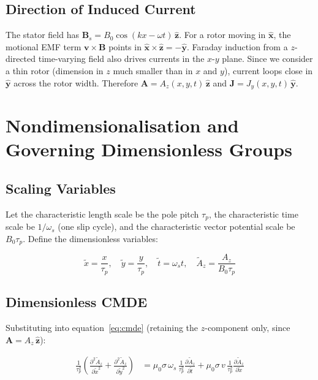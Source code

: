 \documentclass[12pt, a4paper]{article}
\theoremstyle{plain}
\theoremstyle{definition}
\newcommand{\vA}{\mathbf{A}}
\newcommand{\vB}{\mathbf{B}}
\newcommand{\vJ}{\mathbf{J}}
\newcommand{\vv}{\mathbf{v}}
\newcommand{\xhat}{\hat{\mathbf{x}}}
\newcommand{\yhat}{\hat{\mathbf{y}}}
\newcommand{\zhat}{\hat{\mathbf{z}}}
\newcommand{\taup}{\tau_p}
\newcommand{\oms}{\omega_s}
\newcommand{\sig}{\sigma}
\newcommand{\muZ}{\mu_0}
\newcommand{\Der}[2]{\frac{\partial #1}{\partial #2}}
\newcommand{\DDer}[2]{\frac{\partial^2 #1}{\partial #2^2}}
\begin{document}
\subsection{Direction of Induced Current}
\label{sec:currentdir}

The stator field has $\vB_s = B_0\cos(kx - \omega t)\,\zhat$. For a rotor moving
in $\xhat$, the motional EMF term $\vv \times \vB$ points in $\xhat \times \zhat = -\yhat$.
Faraday induction from a $z$-directed time-varying field also drives currents in the
$x$-$y$ plane. Since we consider a thin rotor (dimension in $z$ much smaller than in
$x$ and $y$), current loops close in $\yhat$ across the rotor width. Therefore
$\vA = A_z(x,y,t)\,\zhat$ and $\vJ = J_y(x,y,t)\,\yhat$.


\section{Nondimensionalisation and Governing Dimensionless Groups}
\label{sec:nondim}

\subsection{Scaling Variables}

Let the characteristic length scale be the pole pitch $\taup$, the characteristic time scale
be $1/\oms$ (one slip cycle), and the characteristic vector potential scale be $B_0\taup$.
Define the dimensionless variables:

\begin{equation}
  \tilde{x} = \frac{x}{\taup}, \quad
  \tilde{y} = \frac{y}{\taup}, \quad
  \tilde{t} = \oms t, \quad
  \tilde{A}_z = \frac{A_z}{B_0\taup}
\end{equation}

\subsection{Dimensionless CMDE}

Substituting into equation~\eqref{eq:cmde} (retaining the $z$-component only, since
$\vA = A_z\,\zhat$):

\begin{align}
  \frac{1}{\taup^2}\left(\DDer{\tilde{A}_z}{\tilde{x}} + \DDer{\tilde{A}_z}{\tilde{y}}\right)
  &= \muZ\sig\,\oms\,\frac{1}{\taup^2}\Der{\tilde{A}_z}{\tilde{t}}
   + \muZ\sig\,v\,\frac{1}{\taup^2}\Der{\tilde{A}_z}{\tilde{x}}
\end{align}
\end{document}
